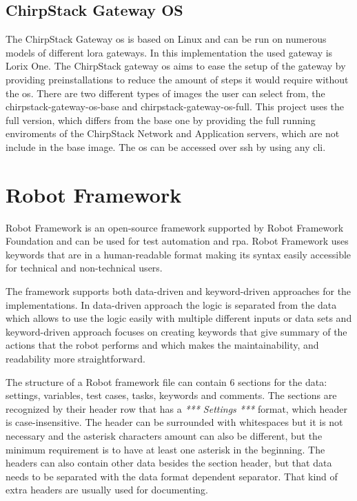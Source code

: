 \subsection{ChirpStack Gateway OS}
The ChirpStack Gateway \gls{os} is based on Linux and can be run on numerous models of different \gls{lora} gateways.
In this implementation the used gateway is Lorix One.
The ChirpStack gateway \gls{os} aims to ease the setup of the gateway by providing preinstallations to reduce the amount of steps it would require without the \gls{os}.
There are two different types of images the user can select from, the chirpstack-gateway-os-base and chirpstack-gateway-os-full.
This project uses the full version, which differs from the base one by providing the full running enviroments of the ChirpStack Network and Application servers, which are not include in the base image.
The \gls{os} can be accessed over \gls{ssh} by using any \gls{cli}.
\cite{chirpstack:gatewayOS}


\section{Robot Framework}
Robot Framework is an open-source framework supported by Robot Framework Foundation and can be used for test automation and \gls{rpa}.
Robot Framework uses keywords that are in a human-readable format making its syntax easily accessible for technical and non-technical users.

\clearpage

The framework supports both data-driven and keyword-driven approaches for the implementations.
In data-driven approach the logic is separated from the data which allows to use the logic easily with multiple different inputs or data sets and keyword-driven approach focuses on creating keywords that give summary of the actions that the robot performs and which makes the maintainability, and readability more straightforward.

The structure of a Robot framework file can contain 6 sections for the data: settings, variables, test cases, tasks, keywords and comments.
The sections are recognized by their header row that has a \textit{*** Settings ***} format, which header is case-insensitive. The header can be surrounded with whitespaces but it is not necessary and the asterisk characters amount can also be different, but the minimum requirement is to have at least one asterisk in the beginning.
The headers can also contain other data besides the section header, but that data needs to be separated with the data format dependent separator.
That kind of extra headers are usually used for documenting.

